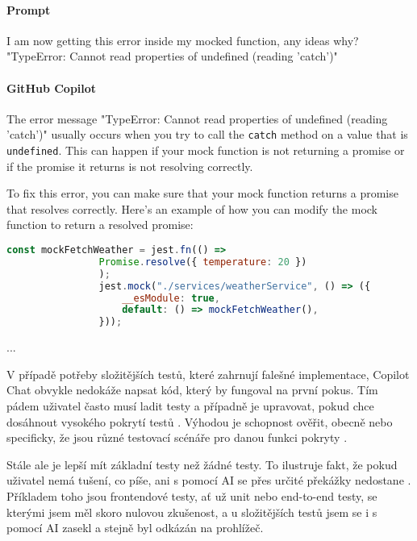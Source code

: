 \documentclass[FM,DP]{tulthesis}
\begin{document}
\begin{tcolorbox}[colback=white,colframe=black,title=Konverzace s opakovaním kódu]
			\paragraph{Prompt}
			I am now getting this error inside my mocked function, any ideas why? "TypeError: Cannot read properties of undefined (reading 'catch')"
			
			\vspace{0.6em}
			
			\paragraph{GitHub Copilot}
			The error message "TypeError: Cannot read properties of undefined (reading 'catch')" usually occurs when you try to call the \verb|catch| method on a value that is \verb|undefined|. This can happen if your mock function is not returning a promise or if the promise it returns is not resolving correctly.
			
			To fix this error, you can make sure that your mock function returns a promise that resolves correctly. Here's an example of how you can modify the mock function to return a resolved promise:
			
			\vspace{0.6em}
			
			\begin{lstlisting}[language=JavaScript]
				const mockFetchWeather = jest.fn(() =>
				Promise.resolve({ temperature: 20 })
				);
				jest.mock("./services/weatherService", () => ({
					__esModule: true,
					default: () => mockFetchWeather(),
				}));
			\end{lstlisting}
			... \cite{mocking_fail}
		\end{tcolorbox}
		
		V případě potřeby složitějších testů, které zahrnují falešné implementace, Copilot Chat obvykle nedokáže napsat kód, který by fungoval na první pokus. Tím pádem uživatel často musí ladit testy a případně je upravovat, pokud chce dosáhnout vysokého pokrytí testů \cite{codecov}. Výhodou je schopnost ověřit, obecně nebo specificky, že jsou různé testovací scénáře pro danou funkci pokryty \cite{TDD} \cite{mocking} \cite{mocking_fail}.
		
		Stále ale je lepší mít základní testy než žádné testy. To ilustruje fakt, že pokud uživatel nemá tušení, co píše, ani s pomocí AI se přes určité překážky nedostane \cite{canvas} \cite{firebase_auth} \cite{firebase}. Příkladem toho jsou frontendové testy, ať už unit nebo end-to-end testy, se kterými jsem měl skoro nulovou zkušenost, a u složitějších testů jsem se i s pomocí AI zasekl a stejně byl odkázán na prohlížeč.
		
\end{document}
